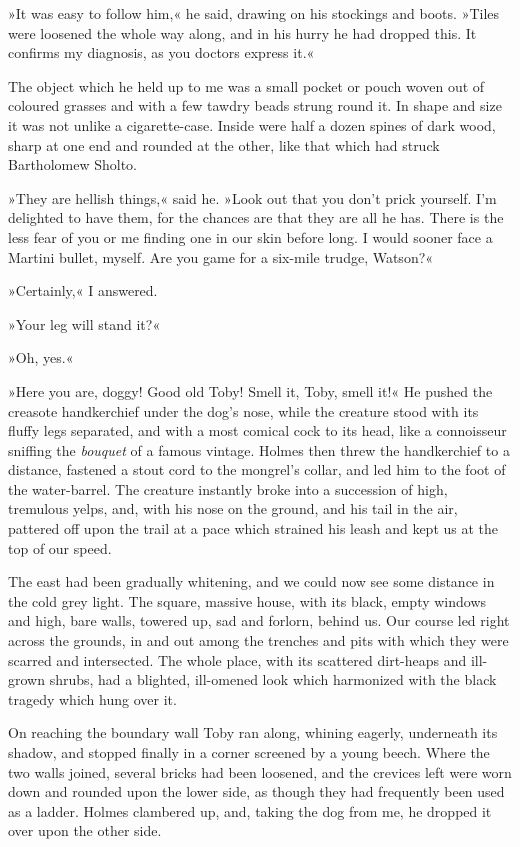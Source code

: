 »It was easy to follow him,« he said, drawing on his stockings and boots. »Tiles were loosened the whole way along, and in his hurry he had dropped this. It confirms my diagnosis, as you doctors express it.«

The object which he held up to me was a small pocket or pouch woven out of coloured grasses and with a few tawdry beads strung round it. In shape and size it was not unlike a cigarette-case. Inside were half a dozen spines of dark wood, sharp at one end and rounded at the other, like that which had struck Bartholomew Sholto.

»They are hellish things,« said he. »Look out that you don't prick yourself. I'm delighted to have them, for the chances are that they are all he has. There is the less fear of you or me finding one in our skin before long. I would sooner face a Martini bullet, myself. Are you game for a six-mile trudge, Watson?«

»Certainly,« I answered.

»Your leg will stand it?«

»Oh, yes.«

»Here you are, doggy! Good old Toby! Smell it, Toby, smell it!« He pushed the creasote handkerchief under the dog's nose, while the creature stood with its fluffy legs separated, and with a most comical cock to its head, like a connoisseur sniffing the \textit{bouquet} of a famous vintage. Holmes then threw the handkerchief to a distance, fastened a stout cord to the mongrel's collar, and led him to the foot of the water-barrel. The creature instantly broke into a succession of high, tremulous yelps, and, with his nose on the ground, and his tail in the air, pattered off upon the trail at a pace which strained his leash and kept us at the top of our speed.

The east had been gradually whitening, and we could now see some distance in the cold grey light. The square, massive house, with its black, empty windows and high, bare walls, towered up, sad and forlorn, behind us. Our course led right across the grounds, in and out among the trenches and pits with which they were scarred and intersected. The whole place, with its scattered dirt-heaps and ill-grown shrubs, had a blighted, ill-omened look which harmonized with the black tragedy which hung over it.

On reaching the boundary wall Toby ran along, whining eagerly, underneath its shadow, and stopped finally in a corner screened by a young beech. Where the two walls joined, several bricks had been loosened, and the crevices left were worn down and rounded upon the lower side, as though they had frequently been used as a ladder. Holmes clambered up, and, taking the dog from me, he dropped it over upon the other side.

